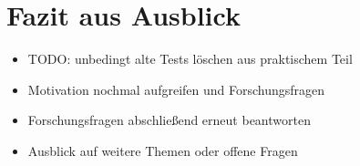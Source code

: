 \chapter{Fazit aus Ausblick}
\label{Fazit}

\begin{itemize}
	\item TODO: unbedingt alte Tests löschen aus praktischem Teil
    \item Motivation nochmal aufgreifen und Forschungsfragen
    \item Forschungsfragen abschließend erneut beantworten
    \item Ausblick auf weitere Themen oder offene Fragen
\end{itemize}